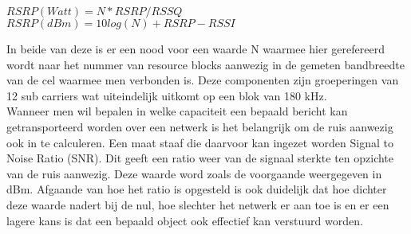 $ RSRP (Watt) = N * RSRP / RSSQ $ \\
$ RSRP (dBm) = 10 log (N) + RSRP - RSSI $

In beide van deze is er een nood voor een waarde N waarmee hier gerefereerd wordt naar het nummer van resource blocks aanwezig in de gemeten bandbreedte van de cel waarmee men verbonden is. \autocite{Kovadloff2021} Deze componenten zijn groeperingen van 12 sub carriers wat uiteindelijk uitkomt op een blok van 180 kHz. \autocite{Mishra2018} \\

Wanneer men wil bepalen in welke capaciteit een bepaald bericht kan getransporteerd worden over een netwerk is het belangrijk om de ruis aanwezig ook in te calculeren. Een maat staaf die daarvoor kan ingezet worden Signal to Noise Ratio (SNR). Dit geeft een ratio weer van de signaal sterkte ten opzichte van de ruis aanwezig. Deze waarde word zoals de voorgaande weergegeven in dBm. Afgaande van hoe het ratio is opgesteld is ook duidelijk dat hoe dichter deze waarde nadert bij de nul, hoe slechter het netwerk er aan toe is en er een lagere kans is dat een bepaald object ook effectief kan verstuurd worden. \autocite{Sheldon2021}







